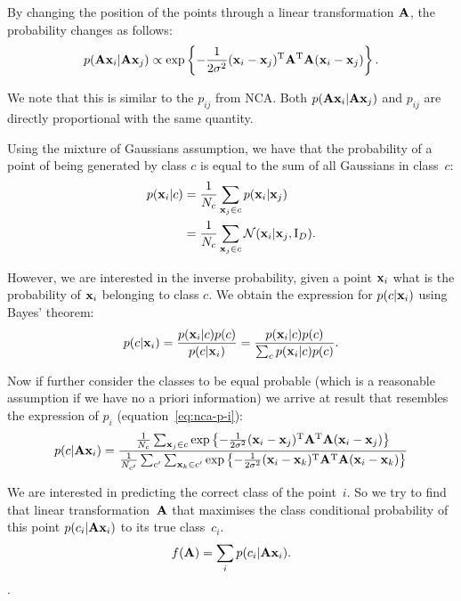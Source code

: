	By changing the position of the points through a linear transformation $\mathbf{A}$,
	the probability changes as follows:
	\begin{align}
	    p(\mathbf{A}\mathbf{x}_i|\mathbf{A}\mathbf{x}_j) \propto \exp \left\{-\frac{1}{2\sigma^2} (\mathbf{x}_i -
	\mathbf{x}_j)^\mathrm{T}\mathbf{A}^\mathrm{T}\mathbf{A}(\mathbf{x}_i - \mathbf{x}_j)\right\}.
	\end{align}
	
	We note that this is similar to the $p_{ij}$ from NCA. Both
	$p(\mathbf{A}\mathbf{x}_i|\mathbf{A}\mathbf{x}_j)$ and $p_{ij}$ are directly proportional with the same
	quantity.
	
	Using the mixture of Gaussians assumption, we have that the probability of a
	point of being generated by class $c$ is equal to the sum of all Gaussians in
	class~$c$:
	\begin{align}
	    p(\mathbf{x}_i|c) &= \frac{1}{N_c}\sum_{\mathbf{x}_j \in c} p(\mathbf{x}_i|\mathbf{x}_j)
		\label{eq:p-x-c}
		\\
	               &= \frac{1}{N_c}\sum_{\mathbf{x}_j \in c} \mathcal{N}(\mathbf{x}_i|\mathbf{x}_j,
	\mathrm{I}_D).
	\end{align}
	
	However, we are interested in the inverse probability, given a point $\mathbf{x}_i$
	what is the probability of $\mathbf{x}_i$ belonging to class $c$. We obtain the
	expression for $p(c|\mathbf{x}_i)$ using Bayes' theorem:
	\begin{align}
	    p(c|\mathbf{x}_i) = \frac{p(\mathbf{x}_i|c)p(c)}{p(c|\mathbf{x}_i)} =
	\frac{p(\mathbf{x}_i|c)p(c)}{\sum_{c} p(\mathbf{x}_i|c)p(c)}.
	    \label{eq:nca-cc-kde-bayes}
	\end{align}
	
	Now if further consider the classes to be equal probable (which is a
	reasonable assumption if we have no a priori information) we arrive at result
	that resembles the expression of $p_i$ (equation~\eqref{eq:nca-p-i}):
	\begin{align}
	    p(c|\mathbf{A}\mathbf{x}_i) = \frac{
	                \frac{1}{N_c}\sum_{\mathbf{x}_j \in
	c}\exp\left\{-\frac{1}{2\sigma^2}(\mathbf{x}_i -
	\mathbf{x}_j)^\mathrm{T}\mathbf{A}^\mathrm{T}\mathbf{A}(\mathbf{x}_i - \mathbf{x}_j)\right\}
	                }
	                {
	                \frac{1}{N_{c'}}\sum_{c'} \sum_{\mathbf{x}_k \in
	c'}\exp\left\{-\frac{1}{2\sigma^2}(\mathbf{x}_i -
	\mathbf{x}_k)^\mathrm{T}\mathbf{A}^\mathrm{T}\mathbf{A}(\mathbf{x}_i - \mathbf{x}_k)\right\}
	                }
	\end{align}
	
	We are interested in predicting the correct class of the point~$i$. So we
	try to find that linear transformation~$\mathbf{A}$ that maximises the class
	conditional probability of this point $p(c_i|\mathbf{A}\mathbf{x}_i)$ to its true class~$c_i$.
	\begin{align}
	    f(\mathbf{A}) = \sum_i p(c_i|\mathbf{A}\mathbf{x}_i).
	    \label{eq:nca-cc-kde-obj}
	\end{align}.
	
